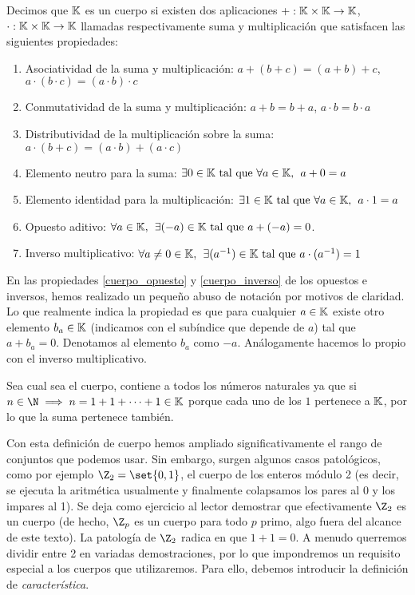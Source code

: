 \documentclass[../ecuaciones_diferenciales.tex]{subfiles}
\begin{document}
\begin{definition}[Cuerpo]
    Decimos que $\mathbb{K}$ es un cuerpo si existen dos aplicaciones $+:\mathbb{K} \times \mathbb{K} \to \mathbb{K}$, $\cdot:\mathbb{K} \times \mathbb{K} \to \mathbb{K}$ llamadas respectivamente suma y multiplicación que satisfacen las siguientes propiedades:
    \begin{enumerate}
        \item Asociatividad de la suma y multiplicación: $a+(b+c)=(a+b)+c$, $a\cdot(b\cdot c)=(a\cdot b)\cdot c$
        \item Conmutatividad de la suma y multiplicación: $a+b=b+a$, $a\cdot b = b \cdot a$
        \item Distributividad de la multiplicación sobre la suma: $a \cdot (b+c) = (a \cdot b) + (a \cdot c)$
        \item Elemento neutro para la suma: $\exists 0 \in \mathbb{K} \mathrm{\,\, tal \,\, que \,\,} \forall a \in \mathbb{K}, \hspace{1.5mm} a+0=a$
        \item Elemento identidad para la multiplicación:  $\exists 1 \in \mathbb{K} \mathrm{\,\, tal \,\, que \,\,} \forall a \in \mathbb{K}, \hspace{1.5mm} a\cdot 1=a$
        \item \label{cuerpo_opuesto} Opuesto aditivo: $\forall a \in \mathbb{K}, \hspace{1.5mm} \exists {(-a)} \in \mathbb{K} \mathrm{\,\, tal \,\, que \,\,} a + (-a) = 0 $.
        \item \label{cuerpo_inverso} Inverso multiplicativo: $\forall a \neq 0 \in \mathbb{K}, \hspace{1.5mm} \exists {(a^{-1})} \in \mathbb{K} \mathrm{\,\, tal \,\, que \,\,} a \cdot (a^{-1}) = 1$
    \end{enumerate}    
\end{definition}

\begin{notation}
    En las propiedades \ref{cuerpo_opuesto} y \ref{cuerpo_inverso} de los opuestos e inversos, hemos realizado un pequeño abuso de notación por motivos de claridad. Lo que realmente indica la propiedad es que para cualquier $a \in \mathbb{K}$ existe otro elemento $b_a \in \mathbb{K}$ (indicamos con el subíndice que depende de $a$) tal que $a + b_a = 0$. Denotamos al elemento $b_a$ como $-a$. Análogamente hacemos lo propio con el inverso multiplicativo. 
\end{notation}

\begin{remark}
    Sea cual sea el cuerpo, contiene a todos los números naturales ya que si $n \in \N \implies n = 1 + 1 + \dots + 1 \in \K$ porque cada uno de los $1$ pertenece a $\mathbb{K}$, por lo que la suma pertenece también.
\end{remark}

Con esta definición de cuerpo hemos ampliado significativamente el rango de conjuntos que podemos usar. Sin embargo, surgen algunos casos patológicos, como por ejemplo $\Z_2 = \set{0, 1}$, el cuerpo de los enteros módulo 2 (es decir, se ejecuta la aritmética usualmente y finalmente colapsamos los pares al 0 y los impares al 1). Se deja como ejercicio al lector demostrar que efectivamente $\Z_2$ es un cuerpo (de hecho, $\Z_p$ es un cuerpo para todo $p$ primo, algo fuera del alcance de este texto). La patología de $\Z_2$ radica en que $1+1=0$. A menudo querremos dividir entre 2 en variadas demostraciones, por lo que impondremos un requisito especial a los cuerpos que utilizaremos. Para ello, debemos introducir la definición de \textit{característica}.
\end{document}
